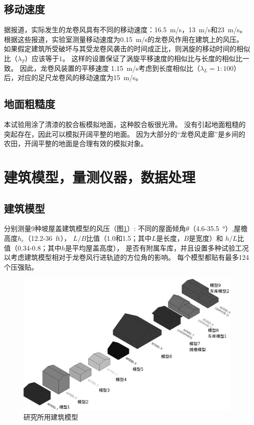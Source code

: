 \documentclass{ctexart}
\begin{document}
\subsection{移动速度}
据报道，实际发生的龙卷风具有不同的移动速度：\SI{16.5}{m/s}\cite{thampi2011finite}，\SI{13}{m/s}\cite{lee2005diagnosed}和\SI{23}{m/s}\cite{haan2008design}。
根据这些报道，实验室测量移动速度为\SI{0.15}{m/s}的龙卷风作用在建筑上的风压。
如果假定建筑所受破坏与其受龙卷风袭击的时间成正比，则涡旋的移动时间的相似比（$\lambda_T$）应该等于$1$。
这样的设置保证了涡旋平移速度的相似比与长度的相似比一致。
因此，龙卷风装置的平移速度 \SI{1.15}{m/s}考虑到长度相似比（$\lambda_L=1:100$）后，对应的足尺龙卷风的移动速度为\SI{15}{m/s}。

\subsection{地面粗糙度}
本试验用涂了清漆的胶合板模拟地面，这种胶合板很光滑。
没有引起地面粗糙的突起存在，因此可以模拟开阔平整的地面。
因为大部分的“龙卷风走廊”是乡间的农田，开阔平整的地面是合理有效的模拟对象。

\section{建筑模型，量测仪器，数据处理}
\subsection{建筑模型}
分别测量9种坡屋盖建筑模型的风压（图\ref{fig:building-models}）:
不同的屋面倾角$\theta$（\num{4.6}-\SI{35.5}{\degree}）,屋檐高度$h_e$（\num{12.2}-\SI{36}{ft}），
$L/B$比值（\num{1.0}和\num{1.5}；其中$L$是长度，$B$是宽度）和
$h/L$比值（\num{0.34}-\num{0.8}；其中$h$是平均屋盖高度），
是否有附属车库，并且设置多种试验工况以考虑建筑模型相对于龙卷风行进轨迹的方位角的影响。
每个模型都贴有最多\num{124}个压强贴。

\begin{figure}
\centering
\includegraphics{./fig/2}
\caption{研究所用建筑模型}
\label{fig:building-models}
\end{figure}
\end{document}
